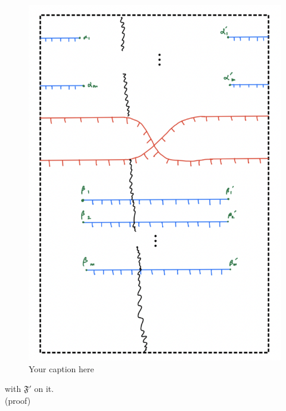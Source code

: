 \begin{figure}[H] %
    \centering
    \includegraphics[scale=0.95]{diagrams/lemma11/6.png} %
    \caption{Your caption here}
    \label{fig:your-label}
\end{figure}

with $\mathfrak{F}'$ on it.\\
(proof)